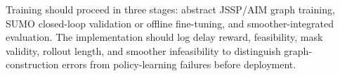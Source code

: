 \begin{addedtwoblock}
Training should proceed in three stages: abstract JSSP/AIM graph training, SUMO closed-loop validation or offline fine-tuning, and smoother-integrated evaluation. The implementation should log delay reward, feasibility, mask validity, rollout length, and smoother infeasibility to distinguish graph-construction errors from policy-learning failures before deployment.
\end{addedtwoblock}




